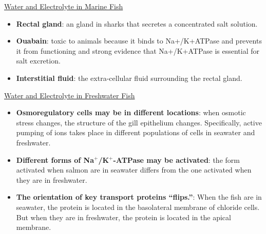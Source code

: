\documentclass[12pt,letterpaper]{article}
\begin{document}
\hypertarget{40.2}{}
\begin{secbox}{\hyperlink{40}{Water and Electrolyte in Marine Fish}}{
    \begin{itemize}
        \item \textbf{Rectal gland}: an gland in sharks that secretes a concentrated salt solution.
        \item \textbf{Ouabain}: toxic to animals because it binds to Na+/K+­ATPase and prevents it from functioning and strong evidence that Na+/K+­ATPase is essential for salt excretion.
        \item \textbf{Interstitial fluid}: the extra-cellular fluid surrounding the rectal gland.
    \end{itemize}
}\end{secbox}

\hypertarget{40.3}{}
\begin{secbox}{\hyperlink{40}{Water and Electrolyte in Freshwater Fish}}{
    \begin{itemize}
        \item \textbf{Osmoregulatory cells may be in different locations}: when osmotic stress changes, the structure of the gill epithelium changes. Specifically, active pumping of ions takes place in different populations of cells in seawater and freshwater.        
        \item \textbf{Different forms of Na\(^+\)/K\(^+\)-ATPase may be activated}: the form activated when salmon are in seawater differs from the one activated when they are in freshwater.
        \item \textbf{The orientation of key transport proteins “flips.”}: When the fish are in seawater, the protein is located in the basolateral membrane of chloride cells. But when they are in freshwater, the protein is located in the apical membrane.
    \end{itemize}
}\end{secbox}
\end{document}
